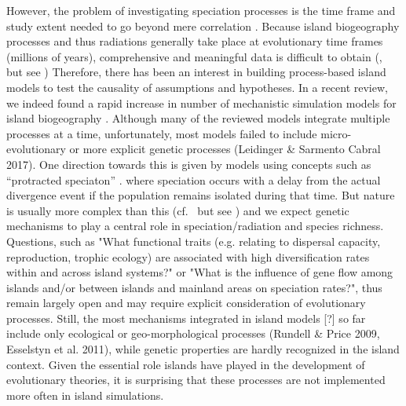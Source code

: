 \documentclass[a4paper]{scrartcl}
\begin{document}
However, the problem of investigating speciation processes is the time frame and study extent needed to go beyond mere correlation \cite{dormannCorrelationProcessSpecies}.
Because island biogeography processes and thus radiations generally take place at evolutionary time frames (millions of years),
comprehensive and meaningful data is difficult to obtain (\cite{didierLikelihoodTreeTopologies2017}, but see \cite{mitchellInferringDiversificationRate})
Therefore, there has been an interest in building process-based island models to test the causality of assumptions and hypotheses.
In a recent review, we indeed found a rapid increase in number of mechanistic simulation models for island biogeography \cite{leidingerBiodiversityDynamicsIslands2017}.
Although many of the reviewed models integrate multiple processes at a time, unfortunately,
most models failed to include micro-evolutionary or more explicit genetic processes %
(Leidinger \& Sarmento Cabral 2017).
One direction towards this is given by models using concepts such as ``protracted speciaton'' \cite{rosindellUnifiedModelSpecies2013}.
where speciation occurs with a delay from the actual
divergence event if the population remains isolated during that time.
But nature is usually more complex than this (cf.\ \cite{silvertownGhostCompetitionPhylogeny2004} but see \cite{herbenGhostHybridizationNiche2005}) 
and we expect genetic mechanisms to play a central role in speciation/radiation and species richness.
Questions, such as "What functional traits (e.g. relating to dispersal capacity,
reproduction, trophic ecology) are associated with high diversification rates within and across island systems?" %
or "What is the influence of gene flow among islands and/or
between islands and mainland areas on speciation rates?", thus remain largely open \cite{patinoRoadmapIslandBiology2017}
and may require explicit consideration of evolutionary processes.
Still, the most mechanisms integrated in island models [?] so far include only ecological
or geo-morphological processes (Rundell \& Price 2009, Esselstyn et al. 2011),
while genetic properties are hardly recognized in the island context.
Given the essential role islands have played in the development of evolutionary theories, it is surprising that these processes
are not implemented more often in island simulations.
\end{document}

